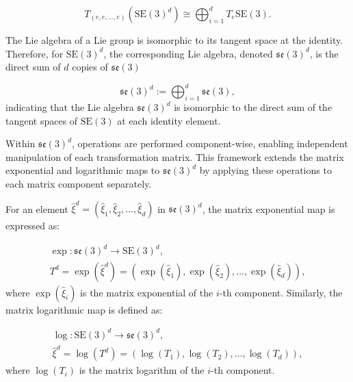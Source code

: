 \begin{equation}
    T_{(e, e, \dots, e)}(\mathrm{SE}(3)^d) \cong \bigoplus_{i=1}^d T_e \mathrm{SE}(3).
\end{equation}

The Lie algebra of a Lie group is isomorphic to its tangent space at the identity. Therefore, for \(\mathrm{SE}(3)^d\), the corresponding Lie algebra, denoted \(\mathfrak{se}(3)^d\), is the direct sum of \( d \) copies of \(\mathfrak{se}(3)\)

\begin{equation}
    \mathfrak{se}(3)^d := \bigoplus_{i=1}^d \mathfrak{se}(3),
\end{equation}
indicating that the Lie algebra \(\mathfrak{se}(3)^d\) is isomorphic to the direct sum of the tangent spaces of \(\mathrm{SE}(3)\) at each identity element. 

Within \(\mathfrak{se}(3)^d\), operations are performed component-wise, enabling independent manipulation of each transformation matrix. This framework extends the matrix exponential and logarithmic maps to \(\mathfrak{se}(3)^d\) by applying these operations to each matrix component separately.

For an element \(\hat \xi^d = (\hat \xi_1, \hat \xi_2, \dots, \hat \xi_d)\) in \(\mathfrak{se}(3)^d\), the matrix exponential map is expressed as:

\begin{equation}
\begin{aligned}
\exp : \mathfrak{se}(3)^d \rightarrow \mathrm{SE}(3)^d, \\
T^d = \exp(\hat \xi^d) = \left(\exp(\hat \xi_1), \exp(\hat \xi_2), \dots, \exp(\hat \xi_d)\right),
\end{aligned}
\end{equation}
where \(\exp(\hat \xi_i)\) is the matrix exponential of the \(i\)-th component. Similarly, the matrix logarithmic map is defined as:

\begin{equation}
\begin{aligned}
\log : \mathrm{SE}(3)^d \rightarrow \mathfrak{se}(3)^d, \\
\hat \xi^d = \log(T^d) = \left(\log(T_1), \log(T_2), \dots, \log(T_d)\right),
\end{aligned}
\end{equation}
where \(\log(T_i)\) is the matrix logarithm of the \(i\)-th component. 


